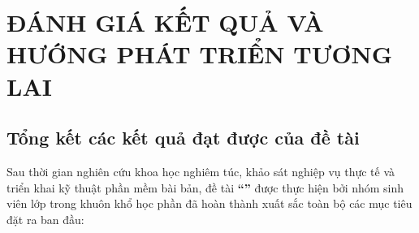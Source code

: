 
\chapter{ĐÁNH GIÁ KẾT QUẢ VÀ HƯỚNG PHÁT TRIỂN TƯƠNG LAI}
\label{chap:ketluan}

\section{Tổng kết các kết quả đạt được của đề tài}
\label{sec:ketqua_datduoc}

Sau thời gian nghiên cứu khoa học nghiêm túc, khảo sát nghiệp vụ thực tế và triển khai kỹ thuật phần mềm bài bản, đề tài \textbf{``\reporttitle''} được thực hiện bởi nhóm sinh viên lớp \textbf{\studentclass} trong khuôn khổ học phần \textbf{\course} đã hoàn thành xuất sắc toàn bộ các mục tiêu đặt ra ban đầu:

